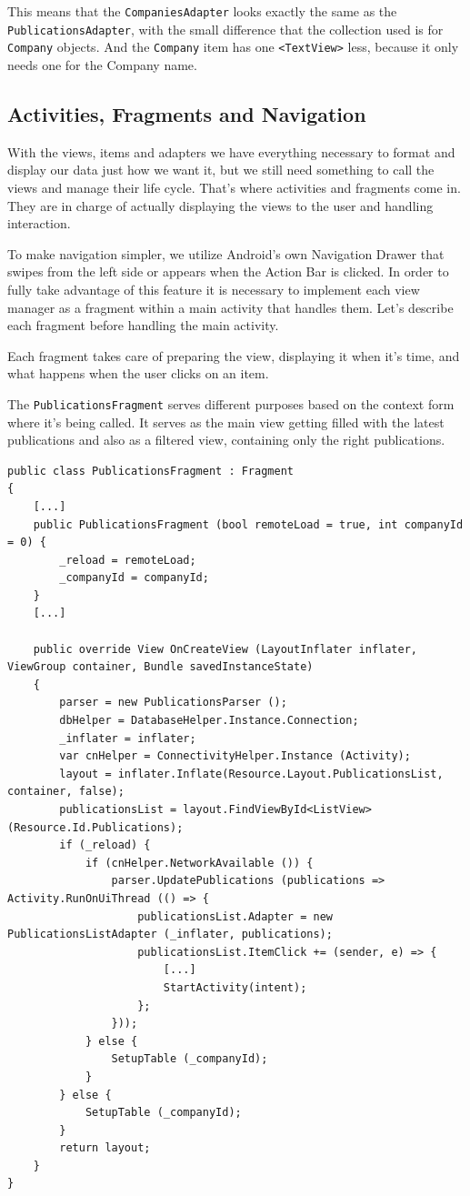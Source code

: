 This means that the \texttt{CompaniesAdapter} looks exactly the same as the \texttt{PublicationsAdapter}, with the small difference that the collection used is for \texttt{Company} objects. And the \texttt{Company} item has one \texttt{<TextView>} less, because it only needs one for the Company name.
\vfill

\subsection{Activities, Fragments and Navigation}

With the views, items and adapters we have everything necessary to format and display our data just how we want it, but we still need something to call the views and manage their life cycle. That's where activities and fragments come in. They are in charge of actually displaying the views to the user and handling interaction.

To make navigation simpler, we utilize Android's own Navigation Drawer that swipes from the left side or appears when the Action Bar is clicked. In order to fully take advantage of this feature it is necessary to implement each view manager as a fragment within a main activity that handles them. Let's describe each fragment before handling the main activity.

Each fragment takes care of preparing the view, displaying it when it's time, and what happens when the user clicks on an item. 

The \texttt{PublicationsFragment} serves different purposes based on the context form where it's being called. It serves as the main view getting filled with the latest publications and also as a filtered view, containing only the right publications.

\lstset{language=[Sharp]C}

\begin{lstlisting}[frame=lt,caption=PublicationsFragment.cs, label={list:pub_frag}]
public class PublicationsFragment : Fragment
{
	[...]
	public PublicationsFragment (bool remoteLoad = true, int companyId = 0) {
		_reload = remoteLoad;
		_companyId = companyId;		
	}
	[...]
	
	public override View OnCreateView (LayoutInflater inflater, ViewGroup container, Bundle savedInstanceState)
	{
		parser = new PublicationsParser ();
		dbHelper = DatabaseHelper.Instance.Connection;
		_inflater = inflater;
		var cnHelper = ConnectivityHelper.Instance (Activity);
		layout = inflater.Inflate(Resource.Layout.PublicationsList, container, false);
		publicationsList = layout.FindViewById<ListView> (Resource.Id.Publications);
		if (_reload) {
			if (cnHelper.NetworkAvailable ()) {
				parser.UpdatePublications (publications => Activity.RunOnUiThread (() => {
					publicationsList.Adapter = new PublicationsListAdapter (_inflater, publications);
					publicationsList.ItemClick += (sender, e) => {
						[...]
						StartActivity(intent);
					};
				}));
			} else {
				SetupTable (_companyId);
			}		
		} else {
			SetupTable (_companyId);	
		}
		return layout;
	}
}
\end{lstlisting}


